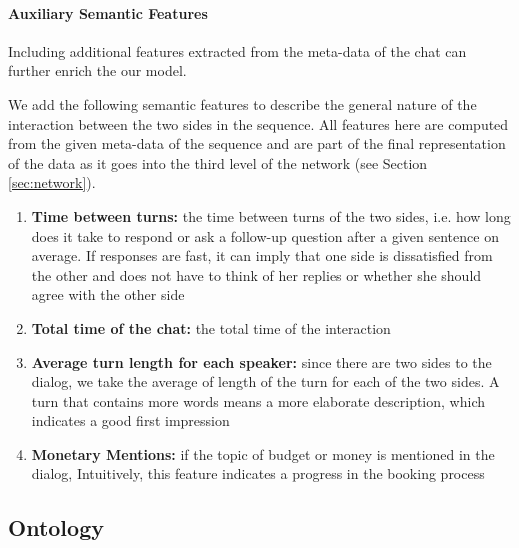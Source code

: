\paragraph*{Auxiliary Semantic Features}\label{sec:semantic}
Including additional features 
extracted from the meta-data of the chat can further enrich the our model. 

We add the following semantic features 
to describe the general nature 
of the interaction between the two sides 
in the sequence. All features here 
are computed from the given meta-data of the sequence and 
are part of the final representation of the data as it goes into the 
third level of the network (see Section \ref{sec:network}). 

\begin{enumerate}
\item {\bf Time between turns: } the time between 
turns of the two sides, i.e. how long does it take to respond or ask a follow-up 
question after a given sentence on average. 
If responses are fast, it can imply that one side is dissatisfied 
from the other and does not have to think of her replies or whether 
she should agree with the other side\label{itm:between}

\item {\bf Total time of the chat: } the total time of the interaction \label{itm:total}

\item {\bf Average turn length for each speaker: } since there are two sides to the dialog, 
we take the average of length of the turn for each of the two sides. 
A turn that contains more words means a more elaborate description, which indicates 
a good first impression\label{itm:sent}


\item {\bf Monetary Mentions: } if the topic of budget or money is mentioned in the dialog, 
Intuitively, this feature indicates a progress in the booking process\label{itm:budget}

\end{enumerate} 

\subsection{Ontology}
